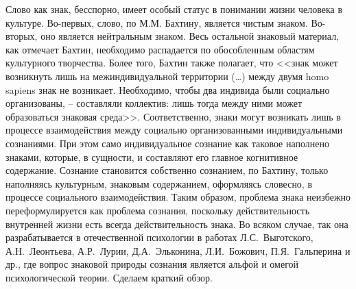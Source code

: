 Слово как знак, бесспорно, имеет особый статус в понимании жизни
человека в культуре. Во-первых, слово, по М.М. Бахтину, является чистым знаком. Во-вторых,
оно является нейтральным знаком. Весь остальной знаковый материал, как
отмечает Бахтин, необходимо распадается по обособленным областям
культурного творчества\autocite[][18]{voloshinov1993}. Более того,
Бахтин также полагает, что <<знак может возникнуть лишь на
межиндивидуальной территории (\ldots) между двумя homo sapiens знак не
возникает. Необходимо, чтобы два индивида были социально
организованы, -- составляли коллектив: лишь тогда между ними может
образоваться знаковая среда>>\autocite[][17]{voloshinov1993}. Соответственно, знаки могут
возникать лишь в процессе взаимодействия между социально
организованными индивидуальными сознаниями. При этом само
индивидуальное сознание как таковое наполнено знаками, которые, в
сущности, и составляют его главное когнитивное содержание. Сознание
становится собственно сознанием, по Бахтину, только наполняясь
культурным, знаковым содержанием, оформляясь словесно, в процессе
социального взаимодействия. Таким образом, проблема знака неизбежно
переформулируется как проблема сознания, поскольку действительность
внутренней жизни есть всегда действительность знака. Во всяком случае,
так она разрабатывается в отечественной психологии в работах Л.С.~Выготского,
А.Н.~Леонтьева, А.Р.~Лурии, Д.А.~Эльконина, Л.И.~Божович,
П.Я.~Гальперина и др., где вопрос знаковой природы сознания является
альфой и омегой психологической теории. Сделаем краткий обзор.

